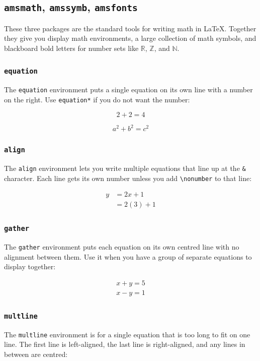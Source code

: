\subsection{\texttt{amsmath}, \texttt{amssymb}, \texttt{amsfonts}}
These three packages are the standard tools for writing math in \LaTeX. Together they give you display math environments, a large collection of math symbols, and blackboard bold letters for number sets like $\mathbb{R}$, $\mathbb{Z}$, and $\mathbb{N}$.

\subsubsection{\texttt{equation}}
The \texttt{equation} environment puts a single equation on its own line with a number on the right. Use \texttt{equation*} if you do not want the number:

\begin{equation}
	2 + 2 = 4
	\label{eq:simple}
\end{equation}

\begin{equation}
	\boxed{a^2 + b^2 = c^2}
	\label{eq:pythagoras}
\end{equation}

\subsubsection{\texttt{align}}
The \texttt{align} environment lets you write multiple equations that line up at the \texttt{\&} character. Each line gets its own number unless you add \texttt{\textbackslash nonumber} to that line:

\begin{align}
	y &= 2x + 1 \\
	&= 2(3) + 1 \nonumber
\end{align}

\subsubsection{\texttt{gather}}
The \texttt{gather} environment puts each equation on its own centred line with no alignment between them. Use it when you have a group of separate equations to display together:

\begin{gather}
	x + y = 5 \\
	x - y = 1
\end{gather}

\subsubsection{\texttt{multline}}
The \texttt{multline} environment is for a single equation that is too long to fit on one line. The first line is left-aligned, the last line is right-aligned, and any lines in between are centred:

